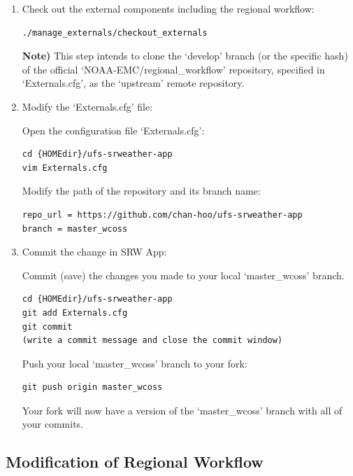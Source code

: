 \documentclass[11pt,fleqn]{report}              %
\begin{document}
\begin{enumerate}
\item Check out the external components including the regional workflow:
\lstset{language=bash}   
\begin{lstlisting}[frame=trBL]
./manage_externals/checkout_externals
\end{lstlisting}

{\bf Note)} This step intends to clone the `develop' branch (or the specific hash) of the official `NOAA-EMC/regional\_workflow' repository, specified in `Externals.cfg', as the `upstream' remote repository.

\item Modify the `Externals.cfg' file:

Open the configuration file `Externals.cfg':
\lstset{language=bash}   
\begin{lstlisting}[frame=trBL]
cd {HOMEdir}/ufs-srweather-app
vim Externals.cfg
\end{lstlisting}

Modify the path of the repository and its branch name:
\lstset{language=bash}   
\begin{lstlisting}[frame=trBL]
repo_url = https://github.com/chan-hoo/ufs-srweather-app
branch = master_wcoss
\end{lstlisting}


\item Commit the change in SRW App:

Commit (save) the changes you made to your local `master\_wcoss' branch.
\lstset{language=bash}   
\begin{lstlisting}[frame=trBL]
cd {HOMEdir}/ufs-srweather-app
git add Externals.cfg
git commit
(write a commit message and close the commit window)
\end{lstlisting}

Push your local `master\_wcoss' branch to your fork:
\lstset{language=bash}   
\begin{lstlisting}[frame=trBL]
git push origin master_wcoss
\end{lstlisting}
Your fork will now have a version of the `master\_wcoss' branch with all of your commits. 

\end{enumerate}



\subsection{Modification of Regional Workflow}
\label{subsec:modify_regional_wflow}
\end{document}
